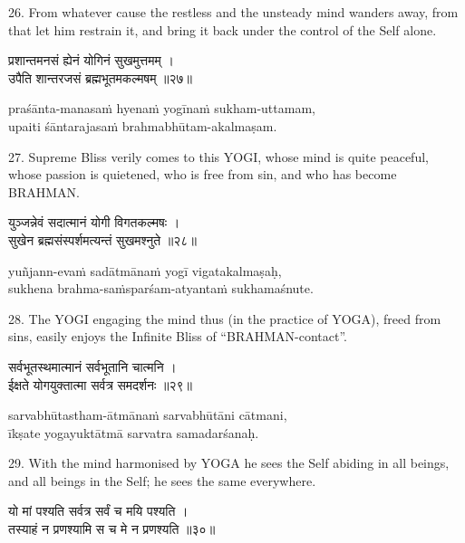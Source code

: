 26. From whatever cause the restless and the unsteady mind wanders away, from
that let him restrain it, and bring it back under the control of the Self
alone.

\begin{gitaverse}
प्रशान्तमनसं ह्येनं योगिनं सुखमुत्तमम् । \\
उपैति शान्तरजसं ब्रह्मभूतमकल्मषम् ॥२७॥
\end{gitaverse}

\begin{transliteration}
praśānta-manasaṁ hyenaṁ yogīnaṁ sukham-uttamam, \\
upaiti śāntarajasaṁ brahmabhūtam-akalmaṣam.
\end{transliteration}

27. Supreme Bliss verily comes to this YOGI, whose mind is quite peaceful,
whose passion is quietened, who is free from sin, and who has become BRAHMAN.\@

\begin{gitaverse}
युञ्जन्नेवं सदात्मानं योगी विगतकल्मषः । \\
सुखेन ब्रह्मसंस्पर्शमत्यन्तं सुखमश्नुते ॥२८॥
\end{gitaverse}

\begin{transliteration}
yuñjann-evaṁ sadātmānaṁ yogī vigatakalmaṣaḥ, \\
sukhena brahma-saṁsparśam-atyantaṁ sukhamaśnute.
\end{transliteration}

28. The YOGI engaging the mind thus (in the practice of YOGA), freed from sins,
easily enjoys the Infinite Bliss of ``BRAHMAN-contact''.

\begin{gitaverse}
सर्वभूतस्थमात्मानं सर्वभूतानि चात्मनि । \\
ईक्षते योगयुक्तात्मा सर्वत्र समदर्शनः ॥२९॥
\end{gitaverse}

\begin{transliteration}
sarvabhūtastham-ātmānaṁ sarvabhūtāni cātmani, \\
īkṣate yogayuktātmā sarvatra samadarśanaḥ.
\end{transliteration}

29. With the mind harmonised by YOGA he sees the Self abiding in all beings,
and all beings in the Self; he sees the same everywhere.

\begin{gitaverse}
यो मां पश्यति सर्वत्र सर्वं च मयि पश्यति । \\
तस्याहं न प्रणश्यामि स च मे न प्रणश्यति ॥३०॥
\end{gitaverse}

